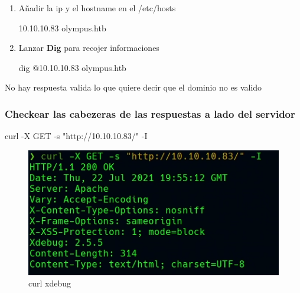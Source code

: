 \documentclass{assets/ipesethesis}
\newenvironment{Shaded}{\begin{snugshade}}{\end{snugshade}}
\newcommand{\ExtensionTok}[1]{#1}
\newcommand{\NormalTok}[1]{#1}
\newcommand{\StringTok}[1]{\textcolor[rgb]{0.31,0.60,0.02}{#1}}
\begin{document}
\begin{enumerate}
\def\labelenumi{\arabic{enumi}.}
\item
  Añadir la ip y el hostname en el /etc/hosts

\begin{Shaded}
\begin{Highlighting}[]
\ExtensionTok{10.10.10.83}\NormalTok{ olympus.htb}
\end{Highlighting}
\end{Shaded}
\item
  Lanzar \textbf{Dig} para recojer informaciones

\begin{Shaded}
\begin{Highlighting}[]
\ExtensionTok{dig}\NormalTok{ @10.10.10.83 olympus.htb}
\end{Highlighting}
\end{Shaded}
\end{enumerate}

No hay respuesta valida lo que quiere decir que el dominio no es valido

\hypertarget{checkear-las-cabezeras-de-las-respuestas-a-lado-del-servidor}{%
\subsubsection*{Checkear las cabezeras de las respuestas a lado del servidor}\label{checkear-las-cabezeras-de-las-respuestas-a-lado-del-servidor}}

\begin{Shaded}
\begin{Highlighting}[]
\ExtensionTok{curl}\NormalTok{ -X GET -s }\StringTok{"http://10.10.10.83/"}\NormalTok{ -I}
\end{Highlighting}
\end{Shaded}

\begin{figure}
\includegraphics[width=0.9\linewidth]{images/curl-xdebug} \caption{curl xdebug}\label{fig:unnamed-chunk-2}
\end{figure}
\end{document}
